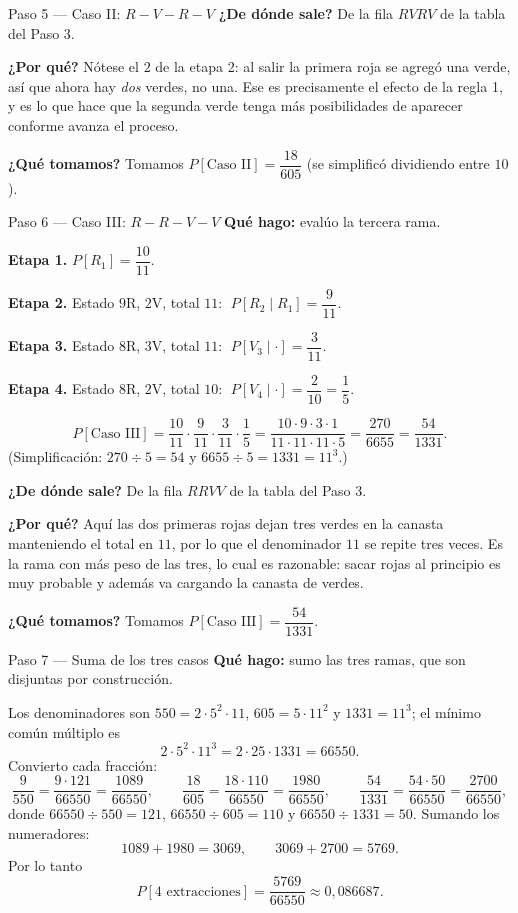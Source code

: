 \documentclass[11pt]{article}
\begin{document}
\begin{sol}
\begin{paso}{Paso 5 --- Caso II: $R\!-\!V\!-\!R\!-\!V$}
\textbf{¿De d\'onde sale?} De la fila $RVRV$ de la tabla del Paso 3.

\textbf{¿Por qu\'e?} N\'otese el $2$ de la etapa 2: al salir la primera roja se agreg\'o una verde, as\'i que ahora hay \emph{dos} verdes, no una. Ese es precisamente el efecto de la regla 1, y es lo que hace que la segunda verde tenga m\'as posibilidades de aparecer conforme avanza el proceso.

\textbf{¿Qu\'e tomamos?} Tomamos $P[\text{Caso II}]=\dfrac{18}{605}$ (se simplific\'o dividiendo entre $10$).
\end{paso}

\begin{paso}{Paso 6 --- Caso III: $R\!-\!R\!-\!V\!-\!V$}
\textbf{Qu\'e hago:} eval\'uo la tercera rama.

\textbf{Etapa 1.} $P[R_1]=\dfrac{10}{11}$.

\textbf{Etapa 2.} Estado $9$R, $2$V, total $11$: $\;P[R_2\mid R_1]=\dfrac{9}{11}$.

\textbf{Etapa 3.} Estado $8$R, $3$V, total $11$: $\;P[V_3\mid\cdot]=\dfrac{3}{11}$.

\textbf{Etapa 4.} Estado $8$R, $2$V, total $10$: $\;P[V_4\mid\cdot]=\dfrac{2}{10}=\dfrac{1}{5}$.

\[
P[\text{Caso III}]=\frac{10}{11}\cdot\frac{9}{11}\cdot\frac{3}{11}\cdot\frac{1}{5}
=\frac{10\cdot 9\cdot 3\cdot 1}{11\cdot 11\cdot 11\cdot 5}
=\frac{270}{6655}=\frac{54}{1331}.
\]
(Simplificaci\'on: $270\div 5=54$ y $6655\div 5=1331=11^{3}$.)

\textbf{¿De d\'onde sale?} De la fila $RRVV$ de la tabla del Paso 3.

\textbf{¿Por qu\'e?} Aqu\'i las dos primeras rojas dejan tres verdes en la canasta manteniendo el total en $11$, por lo que el denominador $11$ se repite tres veces. Es la rama con m\'as peso de las tres, lo cual es razonable: sacar rojas al principio es muy probable y adem\'as va cargando la canasta de verdes.

\textbf{¿Qu\'e tomamos?} Tomamos $P[\text{Caso III}]=\dfrac{54}{1331}$.
\end{paso}

\begin{paso}{Paso 7 --- Suma de los tres casos}
\textbf{Qu\'e hago:} sumo las tres ramas, que son disjuntas por construcci\'on.

Los denominadores son $550=2\cdot 5^{2}\cdot 11$, $605=5\cdot 11^{2}$ y $1331=11^{3}$; el m\'inimo com\'un m\'ultiplo es
\[
2\cdot 5^{2}\cdot 11^{3}=2\cdot 25\cdot 1331=66550 .
\]
Convierto cada fracci\'on:
\[
\frac{9}{550}=\frac{9\cdot 121}{66550}=\frac{1089}{66550},
\qquad
\frac{18}{605}=\frac{18\cdot 110}{66550}=\frac{1980}{66550},
\qquad
\frac{54}{1331}=\frac{54\cdot 50}{66550}=\frac{2700}{66550},
\]
donde $66550\div 550=121$, $66550\div 605=110$ y $66550\div 1331=50$. Sumando los numeradores:
\[
1089+1980=3069,
\qquad
3069+2700=5769 .
\]
Por lo tanto
\[
P[\text{4 extracciones}]=\frac{5769}{66550}\approx 0{,}086687 .
\]


\end{paso}
\end{sol}
\end{document}

